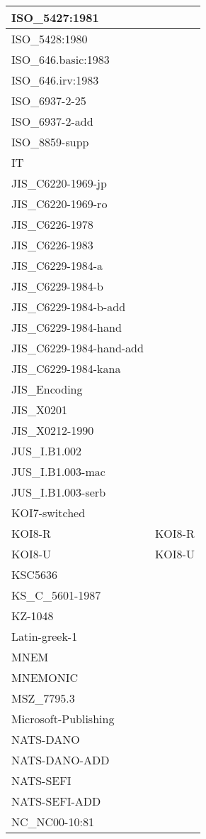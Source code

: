\documentclass{wg21}
\begin{document}
\begin{longtable}{| p{} | p{} |}
ISO_5427:1981 & \\ \hline
ISO_5428:1980 & \\ \hline
ISO_646.basic:1983 & \\ \hline
ISO_646.irv:1983 & \\ \hline
ISO_6937-2-25 & \\ \hline
ISO_6937-2-add & \\ \hline
ISO_8859-supp & \\ \hline
IT & \\ \hline
JIS_C6220-1969-jp & \\ \hline
JIS_C6220-1969-ro & \\ \hline
JIS_C6226-1978 & \\ \hline
JIS_C6226-1983 & \\ \hline
JIS_C6229-1984-a & \\ \hline
JIS_C6229-1984-b & \\ \hline
JIS_C6229-1984-b-add & \\ \hline
JIS_C6229-1984-hand & \\ \hline
JIS_C6229-1984-hand-add & \\ \hline
JIS_C6229-1984-kana & \\ \hline
JIS_Encoding & \\ \hline
JIS_X0201 & \\ \hline
JIS_X0212-1990 & \\ \hline
JUS_I.B1.002 & \\ \hline
JUS_I.B1.003-mac & \\ \hline
JUS_I.B1.003-serb & \\ \hline
KOI7-switched & \\ \hline
KOI8-R & KOI8-R\\ \hline
KOI8-U & KOI8-U\\ \hline
KSC5636 & \\ \hline
KS_C_5601-1987 & \\ \hline
KZ-1048 & \\ \hline
Latin-greek-1 & \\ \hline
MNEM & \\ \hline
MNEMONIC & \\ \hline
MSZ_7795.3 & \\ \hline
Microsoft-Publishing & \\ \hline
NATS-DANO & \\ \hline
NATS-DANO-ADD & \\ \hline
NATS-SEFI & \\ \hline
NATS-SEFI-ADD & \\ \hline
NC_NC00-10:81 & \\ \hline

\end{longtable}
\end{document}
